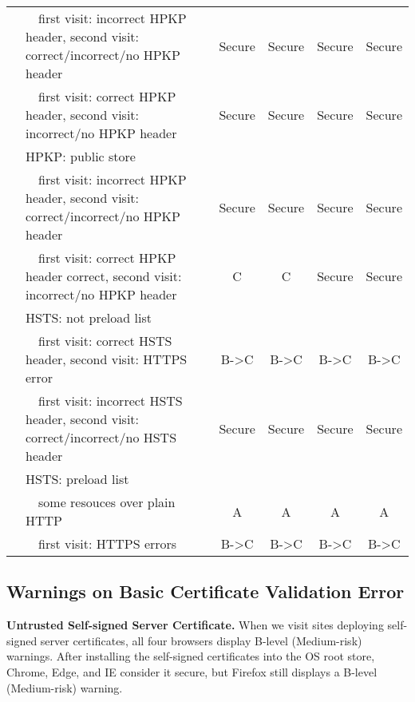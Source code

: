 \begin{table*}[htbp]
\begin{tabular}{p{2.2cm}|l|cccc}
 & ~~first visit: incorrect HPKP header, second visit: correct/incorrect/no HPKP header & Secure & Secure & Secure & Secure \\
 & ~~first visit: correct HPKP header, second visit: incorrect/no HPKP header & Secure & Secure & Secure & Secure \\
 & HPKP: public store &  &  &  &  \\
 & ~~first visit: incorrect HPKP header, second visit: correct/incorrect/no HPKP header & Secure & Secure & Secure & Secure \\
 & ~~first visit: correct HPKP header correct, second visit: incorrect/no HPKP header & C & C & Secure & Secure \\ \cline{2-6}
 & HSTS: not preload list &  &  &  &  \\
 & ~~first visit: correct HSTS header, second visit: HTTPS error & B-\textgreater{}C & B-\textgreater{}C & B-\textgreater{}C & B-\textgreater{}C \\
 & ~~first visit: incorrect HSTS header, second visit: correct/incorrect/no HSTS header & Secure & Secure & Secure & Secure \\
 & HSTS: preload list &  &  &  &  \\
 & ~~some resouces over plain HTTP & A & A & A & A \\
 & ~~first visit: HTTPS errors & B-\textgreater{}C & B-\textgreater{}C & B-\textgreater{}C & B-\textgreater{}C \\ \bottomrule
\end{tabular}
\end{table*}%



\subsection{Warnings on Basic Certificate Validation Error}

\textbf{Untrusted Self-signed Server Certificate.}
    When we visit sites deploying self-signed server certificates, all four browsers display B-level (Medium-risk) warnings.
    After installing the self-signed certificates into the OS root store, Chrome, Edge, and IE consider it secure, but Firefox still displays a B-level (Medium-risk) warning.

